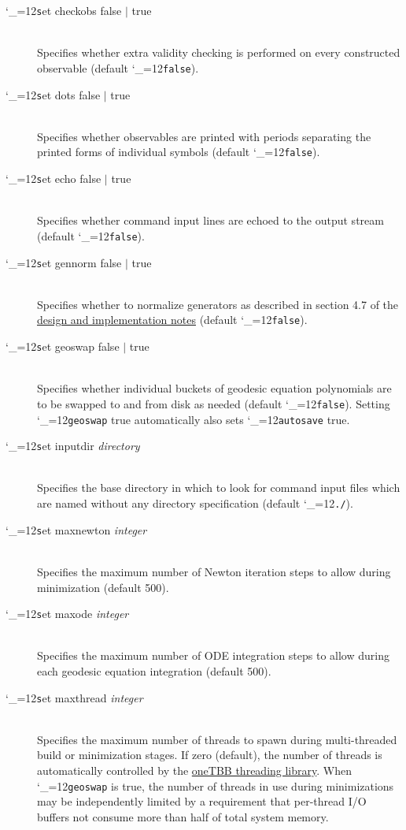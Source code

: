 \documentclass [12pt]{article}
\makeatletter
\renewcommand{\tt}{\begingroup\catcode`_=12\def\_{\string_}\tt@}
\newcommand{\tt@}[1]{\texttt{#1}\endgroup}
\makeatother
\begin{document}
\begin{description}
\item [\tt set checkobs false $\vert$ true]~\\
    Specifies whether extra validity checking is performed
    on every constructed observable (default \tt{false}).

\item [\tt set dots false $\vert$ true]~\\
    Specifies whether observables are printed with
    periods separating the printed forms of individual symbols
    (default \tt{false}).

\item [\tt set echo false $\vert$ true]~\\
    Specifies whether command input lines are echoed
    to the output stream (default \tt{false}).

\item [\tt set gennorm false $\vert$ true]~\\
    Specifies whether to normalize generators
    as described in section 4.7 of the
    \href{https://github.com/lgyaffe/Gordion/blob/main/Doc/design.pdf}
    {design and implementation notes}
    (default \tt{false}).

\item [\tt set geoswap false $\vert$ true]~\\
    Specifies whether individual buckets of
    geodesic equation polynomials are to be
    swapped to and from disk as needed
    (default \tt{false}).
    Setting \tt{geoswap} true automatically
    also sets \tt{autosave} true.

\item [\tt set inputdir {\it directory}]~\\
    Specifies the base directory in which to look
    for command input files which are named
    without any directory specification
    (default \tt{./}).

\item [\tt set maxnewton {\it integer}]~\\
    Specifies the maximum number of
    Newton iteration steps to allow
    during minimization
    (default 500).

\item [\tt set maxode {\it integer}]~\\
    Specifies the maximum number of
    ODE integration steps to allow
    during each geodesic equation integration
    (default 500).

\item [\tt set maxthread {\it integer}]~\\
    Specifies the maximum number of
    threads to spawn during multi-threaded
    build or minimization stages.
    If zero (default), the number of threads is automatically
    controlled by the
    \href{https://en.wikipedia.org/wiki/Threading_Building_Blocks}
    {oneTBB threading library}.
    When \tt{geoswap} is true, 
    the number of threads in use during minimizations
    may be independently limited
    by a requirement that per-thread I/O buffers not
    consume more than half of total system memory.


\end{description}
\end{document}
